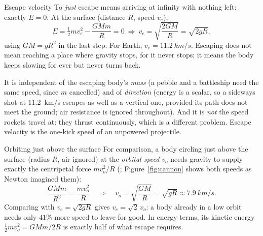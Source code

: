 \begin{derivbox}{Escape velocity}
To \emph{just} escape means arriving at infinity with nothing left: exactly $E=0$. At the surface
(distance $R$, speed $v_e$),
\[
E=\tfrac{1}{2} mv_e^2-\frac{GMm}{R}=0\ \Rightarrow\ v_e=\sqrt{\frac{2GM}{R}}=\sqrt{2gR},
\]
using $GM=gR^2$ in the last step. For Earth, $v_e=\SI{11.2}{km/s}$. Escaping does not mean reaching a
place where gravity stops, for it never stops; it means the body keeps slowing for ever but never turns
back.

\smallskip
It is independent of the escaping body's \emph{mass} (a pebble and a battleship need the same speed,
since $m$ cancelled) and of \emph{direction} (energy is a scalar, so a sideways shot at \SI{11.2}{km/s}
escapes as well as a vertical one, provided its path does not meet the ground; air resistance is
ignored throughout). And it is \emph{not} the speed rockets travel at: they thrust continuously, which
is a different problem. Escape velocity is the one-kick speed of an unpowered projectile.
\end{derivbox}

\begin{derivbox}{Orbiting just above the surface}
For comparison, a body circling just above the surface (radius $R$, air ignored) at the
\emph{orbital speed} $v_o$ needs gravity to supply exactly the centripetal force $mv_o^2/R$
(; Figure~\ref{fig:cannon} shows both speeds as Newton imagined them):
\[
\frac{GMm}{R^2}=\frac{mv_o^2}{R}\quad\Longrightarrow\quad v_o=\sqrt{\frac{GM}{R}}=\sqrt{gR}\approx\SI{7.9}{km/s}.
\]
Comparing with $v_e=\sqrt{2gR}$ gives $v_e=\sqrt2\,v_o$: a body already in a low orbit needs only $41\%$
more speed to leave for good. In energy terms, its kinetic energy $\tfrac12mv_o^2=GMm/2R$ is exactly half
of what escape requires.
\end{derivbox}

\begin{figure}[htbp]
\centering
{}
\end{figure}

